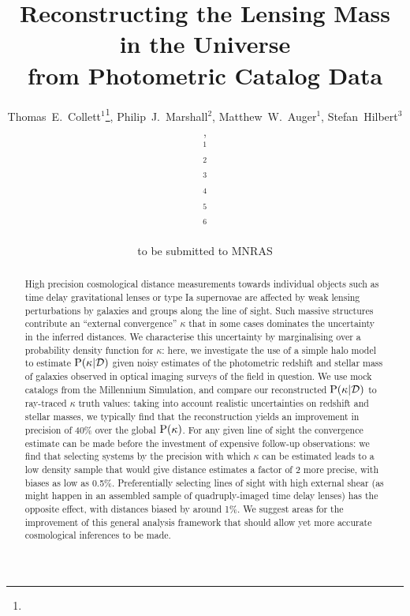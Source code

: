 \documentclass[useAMS,usenatbib]{mn2e}
\title[Line of Sight Mass Reconstruction]
{Reconstructing the Lensing Mass in the Universe \\
from Photometric Catalog Data}
\author[Collett \etal]{%
  Thomas~E.~Collett$^{1}$\thanks{\collettemail},
  Philip~J.~Marshall$^{2}$,
  Matthew~W.~Auger$^{1}$,
  Stefan~Hilbert$^{3}$,
\newauthor{%
  Sherry~H.~Suyu$^{4}$,
  Zachary~Greene$^{4}$,
  Tommaso~Treu$^{4}$\thanks{\packard},
  Vasiliy~Belokurov$^{1}$,}
\newauthor{%
  Christopher~D.~Fassnacht$^{5}$,
  L\`eon~V.~E.~Koopmans$^{6}$,
  Roger~D.~Blandford$^{3}$} 
  \medskip\\
  $^1$\ioa\\
  $^2$\oxford\\
  $^3$\kipac\\
  $^4$\ucsb\\
  $^5$\davis\\
  $^6$\kapteyn
}
\begin{document}
             
\date{to be submitted to MNRAS}
\pagerange{\pageref{firstpage}--\pageref{lastpage}}

\maketitle           

\label{firstpage}


\begin{abstract} 

High precision cosmological distance measurements towards individual objects
such as time delay gravitational lenses or type Ia supernovae are affected by
weak lensing perturbations by galaxies and groups along the line of sight.
Such massive structures contribute an ``external convergence'' $\kappa$ that
in some cases dominates the uncertainty in the inferred distances.  We
characterise this uncertainty by marginalising over a probability density
function for $\kappa$: here, we investigate the use of a simple halo model to
estimate ${\rm P}(\kappa|{\mathcal{D}})$ given noisy estimates of the photometric redshift
and stellar mass of galaxies observed in optical imaging surveys of the field
in question. We use mock catalogs from the Millennium Simulation, and compare
our reconstructed ${\rm P}(\kappa|{\mathcal{D}})$ to ray-traced $\kappa$ truth values: 
taking into account realistic uncertainties on redshift and stellar masses, we
typically find that the reconstruction yields an improvement in precision of
40\% over the global ${\rm P}(\kappa)$. For any given line of sight the
convergence estimate can be made before the investment of expensive follow-up
observations: we find that selecting systems by the precision with which
$\kappa$ can be estimated leads to a low density sample that would give
distance estimates a factor of 2 more precise, with biases as low as 0.5\%.
Preferentially selecting lines of sight with high external shear (as might
happen in an assembled sample of quadruply-imaged time delay lenses) has the
opposite effect, with distances biased by around 1\%. We suggest areas for the
improvement of this general analysis framework that should allow yet more
accurate cosmological inferences to be made.

\end{abstract}

\end{document}
